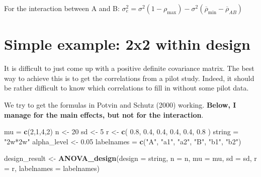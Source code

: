 \documentclass[]{book}
\newenvironment{Shaded}{\begin{snugshade}}{\end{snugshade}}
\newcommand{\DataTypeTok}[1]{\textcolor[rgb]{0.13,0.29,0.53}{#1}}
\newcommand{\DecValTok}[1]{\textcolor[rgb]{0.00,0.00,0.81}{#1}}
\newcommand{\FloatTok}[1]{\textcolor[rgb]{0.00,0.00,0.81}{#1}}
\newcommand{\KeywordTok}[1]{\textcolor[rgb]{0.13,0.29,0.53}{\textbf{#1}}}
\newcommand{\NormalTok}[1]{#1}
\newcommand{\StringTok}[1]{\textcolor[rgb]{0.31,0.60,0.02}{#1}}
\begin{document}
For the interaction between A and B:
\(\sigma _ { e } ^ { 2 } = \sigma ^ { 2 } ( 1 - \rho _ { \max } ) - \sigma ^ { 2 } ( \overline { \rho } _ { \min } - \overline { \rho } _ { AB } )\)

\hypertarget{simple-example-2x2-within-design}{%
\section{Simple example: 2x2 within design}\label{simple-example-2x2-within-design}}

It is difficult to just come up with a positive definite covariance matrix. The best way to achieve this is to get the correlations from a pilot study. Indeed, it should be rather difficult to know which correlations to fill in without some pilot data.

We try to get the formulas in Potvin and Schutz (2000) working. \textbf{Below, I manage for the main effects, but not for the interaction}.

\begin{Shaded}
\begin{Highlighting}[]
\NormalTok{mu =}\StringTok{ }\KeywordTok{c}\NormalTok{(}\DecValTok{2}\NormalTok{,}\DecValTok{1}\NormalTok{,}\DecValTok{4}\NormalTok{,}\DecValTok{2}\NormalTok{) }
\NormalTok{n <-}\StringTok{ }\DecValTok{20}
\NormalTok{sd <-}\StringTok{ }\DecValTok{5}
\NormalTok{r <-}\StringTok{ }\KeywordTok{c}\NormalTok{(}
  \FloatTok{0.8}\NormalTok{, }\FloatTok{0.4}\NormalTok{, }\FloatTok{0.4}\NormalTok{,}
       \FloatTok{0.4}\NormalTok{, }\FloatTok{0.4}\NormalTok{,}
            \FloatTok{0.8}
\NormalTok{  )}
\NormalTok{string =}\StringTok{ "2w*2w"}
\NormalTok{alpha_level <-}\StringTok{ }\FloatTok{0.05}
\NormalTok{labelnames =}\StringTok{ }\KeywordTok{c}\NormalTok{(}\StringTok{"A"}\NormalTok{, }\StringTok{"a1"}\NormalTok{, }\StringTok{"a2"}\NormalTok{, }\StringTok{"B"}\NormalTok{, }\StringTok{"b1"}\NormalTok{, }\StringTok{"b2"}\NormalTok{)}

\NormalTok{design_result <-}\StringTok{ }\KeywordTok{ANOVA_design}\NormalTok{(}\DataTypeTok{design =}\NormalTok{ string,}
                              \DataTypeTok{n =}\NormalTok{ n, }
                              \DataTypeTok{mu =}\NormalTok{ mu, }
                              \DataTypeTok{sd =}\NormalTok{ sd, }
                              \DataTypeTok{r =}\NormalTok{ r, }
                              \DataTypeTok{labelnames =}\NormalTok{ labelnames)}
\end{Highlighting}
\end{Shaded}
\end{document}
